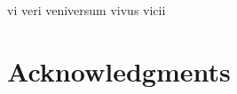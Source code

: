 \chapter*{}

\begin{center}
vi veri veniversum vivus vicii
\end{center}


\chapter*{Acknowledgments}
\newpage